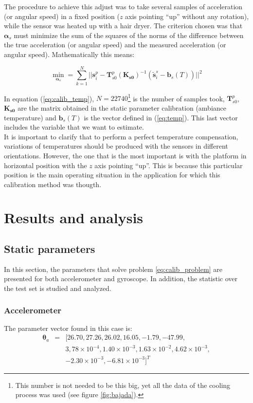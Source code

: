 \documentclass[conference]{IEEEtran}
\newcommand{\refp}[1]{(\ref{#1})}
\begin{document}
The procedure to achieve this adjust was to take several samples of acceleration (or angular speed) in a fixed position ($z$ axis pointing ``up'' without any rotation), while the sensor was heated up with a hair dryer. The criterion chosen was that $\boldsymbol{\alpha}_s$ must minimize the sum of the squares of the norms of the difference between the true acceleration (or angular speed) and the measured acceleration (or angular speed). Mathematically this means:

\begin{equation}
\min_{\boldsymbol{\alpha}_s} = \sum_{k=1}^N ||\mathbf{s}_i^p - \mathbf{T}_{s0}^p(\mathbf{K_{s0}})^{-1}(\tilde{\mathbf{s}}_i^s-\mathbf{b}_s(T))||^2 
\label{eq:calib_temp}
\end{equation}

In equation \refp{eq:calib_temp}, $N = 22740$\footnote{This number is not needed to be this big, yet all the data of the cooling process was used (see figure \ref{fig:bajada}).} is the number of samples took, $\mathbf{T}_{s0}^p$, $\mathbf{K_{s0}}$ are the matrix obtained in the static parameter calibration (ambiance temperature) and $\mathbf{b}_s(T)$ is the vector defined in \refp{eq:temp}. This last vector includes the variable that we want to estimate.\\

It is important to clarify that to perform a perfect temperature compensation, variations of temperatures should be produced with the sensors in different orientations. However, the one that is the most important is with the platform in horizontal position with the $z$ axis pointing ``up''. This is because this particular position is the main operating situation in the application for which this calibration method was thougth.
\section{Results and analysis}
\subsection{Static parameters}
In this section, the parameters that solve problem \ref{eq:calib_problem} are presented for both accelerometer and gyroscope. In addition, the statistic over the test set is studied and analyzed. \\

\subsubsection{Accelerometer}
The parameter vector found in this case is:
\begin{eqnarray}
\boldsymbol{\theta}_a &=& [26.70, 27.26, 26.02, 16.05, -1.79, -47.99,\\ \nonumber
&& 3,78\times 10^{-4}, 1.40\times 10^{-3}, 1.63 \times 10^{-2},  4.62 \times 10^{-3},\\ \nonumber
&& -2.30\times 10^{-3}, -6.81 \times 10^{-3}]^T \nonumber
\end{eqnarray}
\end{document}
